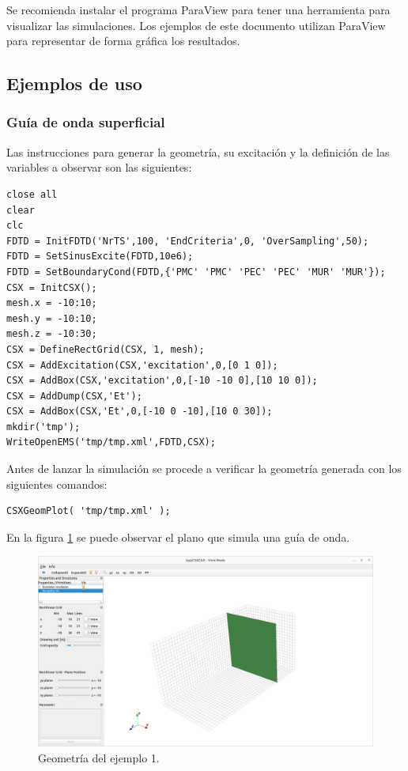 \documentclass[
    11pt,
    spanish,
	a4paper
]{article}
\begin{document}
Se recomienda instalar el programa ParaView para tener una herramienta para
visualizar las simulaciones.
Los ejemplos de este documento utilizan ParaView para representar de forma
gráfica los resultados.

\subsection{Ejemplos de uso}
\label{sub:oejemplos}

\subsubsection{Guía de onda superficial}
\label{subsub:oejemplo1}

Las instrucciones para generar la geometría, su excitación y la definición de
las variables a observar son las siguientes:

\begin{verbatim}
close all
clear
clc
FDTD = InitFDTD('NrTS',100, 'EndCriteria',0, 'OverSampling',50);
FDTD = SetSinusExcite(FDTD,10e6);
FDTD = SetBoundaryCond(FDTD,{'PMC' 'PMC' 'PEC' 'PEC' 'MUR' 'MUR'});
CSX = InitCSX();
mesh.x = -10:10;
mesh.y = -10:10;
mesh.z = -10:30;
CSX = DefineRectGrid(CSX, 1, mesh);
CSX = AddExcitation(CSX,'excitation',0,[0 1 0]);
CSX = AddBox(CSX,'excitation',0,[-10 -10 0],[10 10 0]);
CSX = AddDump(CSX,'Et');
CSX = AddBox(CSX,'Et',0,[-10 0 -10],[10 0 30]);
mkdir('tmp');
WriteOpenEMS('tmp/tmp.xml',FDTD,CSX);
\end{verbatim}

Antes de lanzar la simulación se procede a verificar la geometría generada con
los siguientes comandos:

\begin{verbatim}
CSXGeomPlot( 'tmp/tmp.xml' );
\end{verbatim}

En la figura \ref{fig:geo1} se puede observar el plano que simula una guía de onda.

\begin{figure}[htbp]
	\centering
	\includegraphics[width=\textwidth]{./img/geo1.png}
	\caption{Geometría del ejemplo 1.}
	\label{fig:geo1}
\end{figure}
\end{document}

